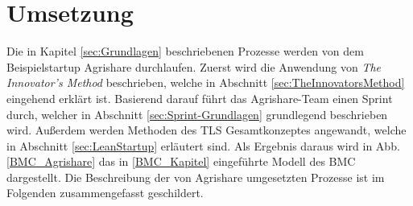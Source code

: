 \chapter{Umsetzung}
\label{sec:Umsetzung}
Die in Kapitel \ref{sec:Grundlagen} beschriebenen Prozesse werden von dem Beispielstartup Agrishare durchlaufen. Zuerst wird die Anwendung von \textit{The Innovator's Method} beschrieben, welche in Abschnitt \ref{sec:TheInnovatorsMethod} eingehend erklärt ist. Basierend darauf führt das Agrishare-Team einen Sprint durch, welcher in Abschnitt \ref{sec:Sprint-Grundlagen} grundlegend beschrieben wird. Außerdem werden Methoden des \ac{TLS} Gesamtkonzeptes angewandt, welche in Abschnitt \ref{sec:LeanStartup} erläutert sind. Als Ergebnis daraus wird in Abb. \ref{BMC_Agrishare} das in \ref{BMC_Kapitel} eingeführte Modell des \ac{BMC} dargestellt. Die Beschreibung der von Agrishare umgesetzten Prozesse ist im Folgenden zusammengefasst geschildert.



